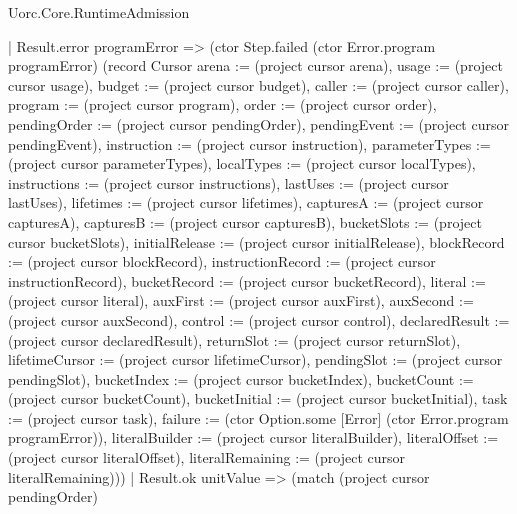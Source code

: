 \begin{lexlean}{Uorc.Core.RuntimeAdmission}
\begin{semanticmodule}
{            | Result.error programError => (ctor Step.failed (ctor Error.program programError) (record Cursor {arena := (project cursor arena), usage := (project cursor usage), budget := (project cursor budget), caller := (project cursor caller), program := (project cursor program), order := (project cursor order), pendingOrder := (project cursor pendingOrder), pendingEvent := (project cursor pendingEvent), instruction := (project cursor instruction), parameterTypes := (project cursor parameterTypes), localTypes := (project cursor localTypes), instructions := (project cursor instructions), lastUses := (project cursor lastUses), lifetimes := (project cursor lifetimes), capturesA := (project cursor capturesA), capturesB := (project cursor capturesB), bucketSlots := (project cursor bucketSlots), initialRelease := (project cursor initialRelease), blockRecord := (project cursor blockRecord), instructionRecord := (project cursor instructionRecord), bucketRecord := (project cursor bucketRecord), literal := (project cursor literal), auxFirst := (project cursor auxFirst), auxSecond := (project cursor auxSecond), control := (project cursor control), declaredResult := (project cursor declaredResult), returnSlot := (project cursor returnSlot), lifetimeCursor := (project cursor lifetimeCursor), pendingSlot := (project cursor pendingSlot), bucketIndex := (project cursor bucketIndex), bucketCount := (project cursor bucketCount), bucketInitial := (project cursor bucketInitial), task := (project cursor task), failure := (ctor Option.some [Error] (ctor Error.program programError)), literalBuilder := (project cursor literalBuilder), literalOffset := (project cursor literalOffset), literalRemaining := (project cursor literalRemaining)}))
            | Result.ok unitValue => (match (project cursor pendingOrder)
}
\end{semanticmodule}
\end{lexlean}
